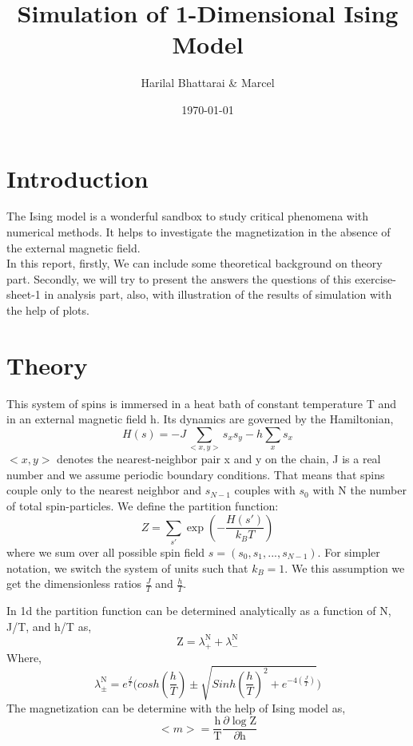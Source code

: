 \documentclass[11pt, a4paper, DIV=12]{scrartcl}
\title{Simulation of 1-Dimensional Ising Model}
\date{\today}
\author{Harilal Bhattarai \& Marcel}
\begin{document}
	\maketitle
	
\section{Introduction}
The Ising model is a wonderful sandbox to study critical phenomena with numerical methods. It helps to investigate the magnetization in the absence of the external magnetic field.\\

In this report, firstly, We can include some theoretical background on theory part. Secondly, we will try to present the answers the questions of this exercise-sheet-1 in analysis part, also, with illustration of the results of simulation with the help of plots.  

\section{Theory}

This system of spins is immersed in a heat bath of constant temperature T and in an external magnetic field h. Its dynamics are governed by the Hamiltonian,
\begin{equation}
H(s)= -J \sum_{<x,y>}s_{x}s_{y} - h \sum_{x}s_{x}
\end{equation}
$ <x,y> $ denotes the nearest-neighbor pair x and y on the chain, J is a real number and we assume periodic boundary conditions. That means that spins couple only to the nearest neighbor and $s_{N-1}$ couples with $s_0$ with N the number of total spin-particles. We define the partition function:
\begin{equation}
	Z= \sum_{s'} \exp(-\frac{H(s')}{k_B T})
\end{equation}
where we sum over all possible spin field $s=(s_0,s_1,...,s_{N-1})$. For simpler notation, we switch the system of units such that $k_B=1$. We this assumption we get the dimensionless ratios $\frac{J}{T}$ and $\frac{h}{T}$.

In 1d the partition function can be determined analytically as a function of N, J/T, and h/T as,
\begin{equation}
\text{Z}=\lambda^{\text{N}}_{+} + \lambda^{\text{N}}_{-}
\end{equation}
Where, 
\begin{equation}
 \lambda^{\text{N}}_{\pm}= e^{\frac{J}{T}} \bigg(cosh(\frac{h}{T})\pm \sqrt{Sinh(\frac{h}{T})^2 + e^{-4(\frac{J}{T})}} \bigg) 
 \label{Equ:lambda}
	\end{equation}
The magnetization can be determine with the help of Ising model as, 
\begin{equation}
<m> = \frac{\text{h}}{\text{T}} \frac{\partial\log \text{Z}}{\partial \text{h}}
\label{equ:m}
\end{equation}  
\end{document}
